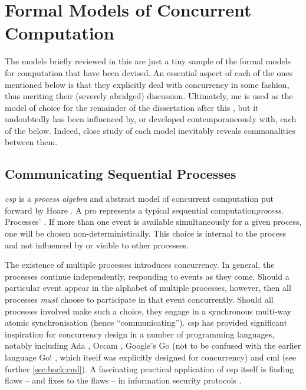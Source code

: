 \section{\label{sec:back:formalmodels}Formal Models of Concurrent Computation}
The models briefly reviewed in this  are just a tiny sample of the formal models for computation that have been devised.  An essential aspect of each of the ones mentioned below is that they explicitly deal with concurrency in some fashion, thus meriting their (severely abridged) discussion.  Ultimately, \gls{mc} is used as the model of choice for the remainder of the dissertation after this , but it undoubtedly has been influenced by, or developed contemporaneously with, each of the below.  Indeed, close study of each model inevitably reveals commonalities between them.

\subsection{\label{subsec:back:csp}Communicating Sequential Processes}

\emph{\Gls{csp}} is a \emph{process algebra} and abstract model of concurrent computation put forward by Hoare \cite{Hoare1985,Roscoe2011}.  A pro represents a typical sequential computation\emph{process}.  Processes' .  If more than one event is available simultaneously for a given process, one will be chosen non-deterministically.  This choice is internal to the process and not influenced by or visible to other processes.

The existence of multiple processes introduces concurrency.  In general, the processes continue independently, responding to events as they come.  Should a particular event appear in the alphabet of multiple processes, however, then all processes \emph{must} choose to participate in that event concurrently.  Should all processes involved make such a choice, they engage in a synchronous multi-way atomic synchronisation (hence ``communicating'').  \Gls{csp} has provided significant inspiration for concurrency design in a number of programming languages, notably including Ada \cite{Defense1983,Taft2013}, Occam \cite{Elizabeth1987}, Google's Go \cite{Meyerson2014} (not to be confused with the earlier language Go! \cite{Clark2004}, which itself was explicitly designed for concurrency) and \gls{cml} \cite{Reppy2011} (see further \vref{sec:back:cml}).  A fascinating practical application of \gls{csp} itself is finding flaws -- and fixes to the flaws -- in information security protocols \cite{Roscoe1995,Lowe1996,Koltuksuz2010}.

